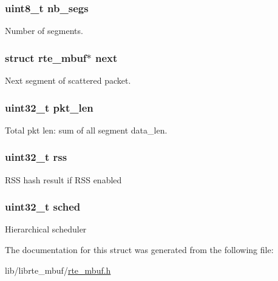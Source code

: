 \subsubsection[{nb\+\_\+segs}]{\setlength{\rightskip}{0pt plus 5cm}uint8\+\_\+t nb\+\_\+segs}\label{structrte__pktmbuf_a54163d61074a843b5a9560b74f7d3581}
Number of segments. \hypertarget{structrte__pktmbuf_ac858fb3bb1a1d67a6efc9563d0c5a471}{}
\subsubsection[{next}]{\setlength{\rightskip}{0pt plus 5cm}struct {\bf rte\+\_\+mbuf}$\ast$ next}\label{structrte__pktmbuf_ac858fb3bb1a1d67a6efc9563d0c5a471}
Next segment of scattered packet. \hypertarget{structrte__pktmbuf_a5046af233a45d6d79ce1a5aae535b23c}{}
\subsubsection[{pkt\+\_\+len}]{\setlength{\rightskip}{0pt plus 5cm}uint32\+\_\+t pkt\+\_\+len}\label{structrte__pktmbuf_a5046af233a45d6d79ce1a5aae535b23c}
Total pkt len\+: sum of all segment data\+\_\+len. \hypertarget{structrte__pktmbuf_aa4ca178cafee9969f22897e1a90a1cfa}{}
\subsubsection[{rss}]{\setlength{\rightskip}{0pt plus 5cm}uint32\+\_\+t rss}\label{structrte__pktmbuf_aa4ca178cafee9969f22897e1a90a1cfa}
R\+S\+S hash result if R\+S\+S enabled \hypertarget{structrte__pktmbuf_ac13bd4c368ee023f5dcf76070392323e}{}
\subsubsection[{sched}]{\setlength{\rightskip}{0pt plus 5cm}uint32\+\_\+t sched}\label{structrte__pktmbuf_ac13bd4c368ee023f5dcf76070392323e}
Hierarchical scheduler 

The documentation for this struct was generated from the following file\+:\begin{DoxyCompactItemize}
\item 
lib/librte\+\_\+mbuf/\hyperlink{rte__mbuf_8h}{rte\+\_\+mbuf.\+h}\end{DoxyCompactItemize}
